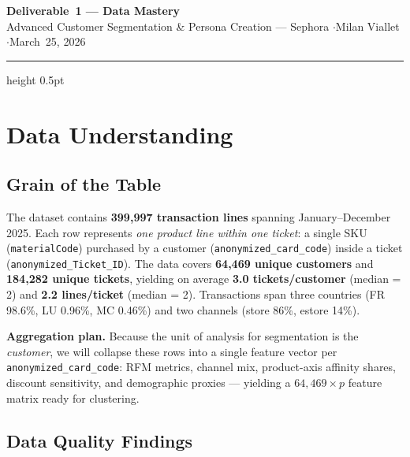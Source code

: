 \documentclass[9pt,a4paper]{article}
\begin{document}
\begin{center}
{\large\bfseries\color{MidnightBlue} Deliverable~1 --- Data Mastery}\\[2pt]
{\small Advanced Customer Segmentation \& Persona Creation --- Sephora \quad$\cdot$\quad Milan Viallet \quad$\cdot$\quad March~25, 2026}
\end{center}
\vspace{-4pt}\hrule height 0.5pt\vspace{3pt}

\section{Data Understanding}

\subsection{Grain of the Table}

The dataset contains \textbf{399{,}997 transaction lines} spanning January--December 2025.
Each row represents \emph{one product line within one ticket}: a single SKU (\texttt{materialCode}) purchased by a customer (\texttt{anonymized\_card\_code}) inside a ticket (\texttt{anonymized\_Ticket\_ID}).
The data covers \textbf{64{,}469 unique customers} and \textbf{184{,}282 unique tickets}, yielding on average \textbf{3.0 tickets/customer} (median = 2) and \textbf{2.2 lines/ticket} (median = 2).
Transactions span three countries (FR 98.6\%, LU 0.96\%, MC 0.46\%) and two channels (store 86\%, estore 14\%).

\textbf{Aggregation plan.}
Because the unit of analysis for segmentation is the \emph{customer}, we will collapse these rows into a single feature vector per \texttt{anonymized\_card\_code}: RFM metrics, channel mix, product-axis affinity shares, discount sensitivity, and demographic proxies --- yielding a $64{,}469 \times p$ feature matrix ready for clustering.

\subsection{Data Quality Findings}
\end{document}

